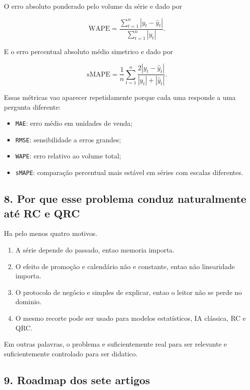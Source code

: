 \documentclass[12pt]{article}
\providecommand{\tightlist}{%
          \setlength{\itemsep}{0pt}\setlength{\parskip}{0pt}}
\begin{document}
O erro absoluto ponderado pelo volume da série e dado por

\[
\mathrm{WAPE} = \frac{\sum_{t=1}^n |y_t - \hat{y}_t|}{\sum_{t=1}^n |y_t|}.
\]

E o erro percentual absoluto médio simetrico e dado por

\[
\mathrm{sMAPE} = \frac{1}{n} \sum_{t=1}^n
\frac{2 |y_t - \hat{y}_t|}{|y_t| + |\hat{y}_t|}.
\]

Essas métricas vao aparecer repetidamente porque cada uma responde a uma pergunta diferente:

\begin{itemize}
\tightlist
\item
  \texttt{MAE}: erro médio em unidades de venda;
\item
  \texttt{RMSE}: sensibilidade a erros grandes;
\item
  \texttt{WAPE}: erro relativo ao volume total;
\item
  \texttt{sMAPE}: comparação percentual mais estável em séries com escalas diferentes.
\end{itemize}

\subsection{8. Por que esse problema conduz naturalmente até RC e QRC}\label{8-por-que-esse-problema-conduz-naturalmente-atuxe9-rc-e-qrc}

Ha pelo menos quatro motivos.

\begin{enumerate}
\def\labelenumi{\arabic{enumi}.}
\tightlist
\item
  A série depende do passado, entao memoria importa.
\item
  O efeito de promoção e calendário não e constante, entao não linearidade importa.
\item
  O protocolo de negócio e simples de explicar, entao o leitor não se perde no dominio.
\item
  O mesmo recorte pode ser usado para modelos estatísticos, IA clássica, RC e QRC.
\end{enumerate}

Em outras palavras, o problema e suficientemente real para ser relevante e suficientemente controlado para ser didatico.

\subsection{9. Roadmap dos sete artigos}\label{9-roadmap-dos-sete-artigos}
\end{document}
